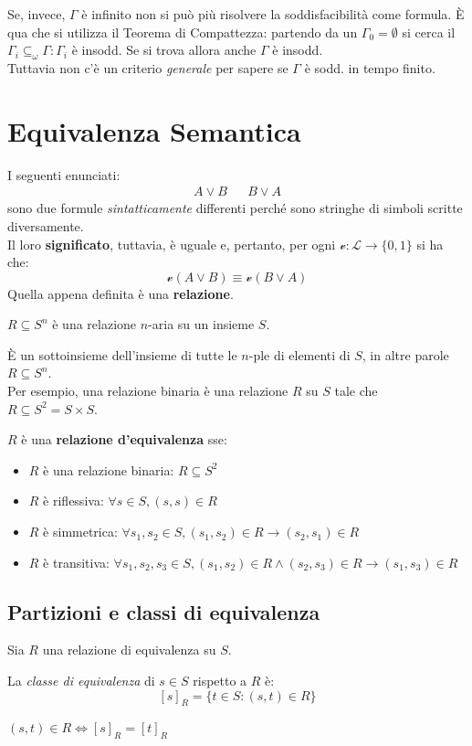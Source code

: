 Se, invece, $\Gamma$ è infinito non si può più risolvere la soddisfacibilità come formula. È qua che si utilizza il Teorema di Compattezza: partendo da un $\Gamma_0 = \emptyset$ si cerca il $\Gamma_i \subseteq_{\omega} \Gamma : \Gamma_i$ è insodd. Se si trova allora anche $\Gamma$ è insodd.\\
Tuttavia non c'è un criterio \textit{generale} per sapere se $\Gamma$ è sodd. in tempo finito.

\section{Equivalenza Semantica}
I seguenti enunciati:
\begin{align*}
  A \lor B & & B \lor A
\end{align*}
sono due formule \textit{sintatticamente} differenti perché sono stringhe di simboli scritte diversamente.\\
Il loro \textbf{significato}, tuttavia, è uguale e, pertanto, per ogni $\mathcal{v} : \mathscr{L} \rightarrow \{0,1\}$ si ha che:
$$
\mathcal{v}(A \lor B) \equiv \mathcal{v}(B \lor A)
$$
Quella appena definita è una \textbf{relazione}. 

\begin{defi}
$R \subseteq S^{n}$ è una relazione $n$-aria su un insieme $S$.
\end{defi}
È un sottoinsieme dell'insieme di tutte le $n$-ple di elementi di $S$, in altre parole $R \subseteq S^{n}$.\\
Per esempio, una relazione binaria è una relazione $R$ su $S$ tale che $R \subseteq S^2 = S \times S$. 
\begin{defi}
$R$ è una \textbf{relazione d'equivalenza} sse: 
\begin{itemize}
  \item $R$ è una relazione binaria: $R \subseteq S^2$
  \item $R$ è riflessiva: $\forall s \in S, (s,s) \in R$
  \item $R$ è simmetrica: $\forall s_1, s_2 \in S, (s_1, s_2) \in R \rightarrow (s_2, s_1) \in R$
  \item $R$ è transitiva: $\forall s_1, s_2, s_3 \in S, (s_1, s_2) \in R \land (s_2, s_3) \in R \rightarrow (s_1, s_3) \in R$
\end{itemize}
\end{defi}

\subsection{Partizioni e classi di equivalenza}
\label{partizioni-e-classi}
Sia $R$ una relazione di equivalenza su $S$.
\begin{defi}
  La \textit{classe di equivalenza} di $s \in S$ rispetto a $R$ è:
  $$[s]_R = \{ t \in S : (s,t) \in R\}$$
\end{defi}
\begin{oss}
  $(s,t) \in R \iff [s]_R = [t]_R$
\end{oss}

